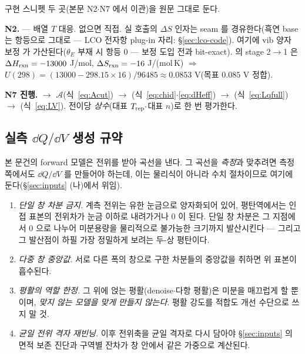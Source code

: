 구현 스니펫 두 곳(본문 N2$\cdot$N7 에서 이관)을 원문 그대로 둔다.
\begin{codebox}
\textbf{N2.} 
--- 배열 $T$ 대응. 없으면  직접. 실 호출의 $\Delta S$ 인자는 seam
 를 경유한다(흑연 base 는 항등으로  그대로 ---
LCO 전자항 plug-in 자리: \S\ref{sec:lco-code}). 여기에 vib 양자 보정  가
가산된다($\theta_E$ 부재 시 항등 $0$ --- 보정 도입 전과 bit-exact).  의 stage 2$\to$1 은
$\Delta H_{\mathrm{rxn}}=-13000$ J/mol, $\Delta S_{\mathrm{rxn}}=-16$ J/(mol\,K) $\Rightarrow$ $U(298)=(13000-298.15\times16)/96485
\approx0.0853$ V(목표 $0.085$ V 정합).
\end{codebox}
\begin{codebox}
\textbf{N7 진행.}  $\to$ $\mathcal A$(식~\eqref{eq:Acut}) $\to$
 (식~\eqref{eq:chid}$\cdot$\eqref{eq:dHeff}) $\to$
 (식~\eqref{eq:Lqfull}) $\to$  (식~\eqref{eq:LV}).
전이당 \emph{상수}(대표 $T_{\mathrm{rep}}\cdot$대표 $n$)로 한 번 평가한다.
\end{codebox}

\subsection{실측 $\dd Q/\dd V$ 생성 규약}\label{ssec:code-dqdv-numeric}
본 문건의 forward 모델은 전위를 받아 곡선을 낸다. 그 곡선을 \emph{측정}과 맞추려면 측정 쪽에서도
$\dd Q/\dd V$ 를 만들어야 하는데, 이는 물리식이 아니라 수치 절차이므로 여기에 둔다(\S\ref{sec:inputs} (나)에서 위임).
\begin{enumerate}[label=(\arabic*),leftmargin=2.0em,itemsep=3pt]
\item \emph{단일 창 차분 금지.} 계측 전위는 유한 눈금으로 양자화되어 있어, 평탄역에서는 인접 표본의
전위차가 눈금 이하로 내려가거나 $0$ 이 된다. 단일 창 차분은 그 지점에서 $0$ 으로 나누어 미분용량을
물리적으로 불가능한 크기까지 발산시킨다 --- 그리고 그 발산점이 하필 가장 정밀하게 보려는 두-상 평탄이다.
\item \emph{다중 창 중앙값.} 서로 다른 폭의 창으로 구한 차분들의 중앙값을 취하면 위 표본이 흡수된다.
\item \emph{평활의 역할 한정.} 그 위에 얹는 평활(denoise$\cdot$다항 평활)은 미분을 매끄럽게 할 뿐이며,
\emph{맞지 않는 모델을 맞게 만들지 않는다}. 평활 강도를 적합도 개선 수단으로 쓰지 말 것.
\item \emph{균일 전위 격자 재빈닝.} 이후 전위축을 균일 격자로 다시 담아야
\S\ref{sec:inputs} 의 면적 보존 진단과 구역별 잔차가 창 안에서 같은 가중으로 계산된다.
\end{enumerate}

